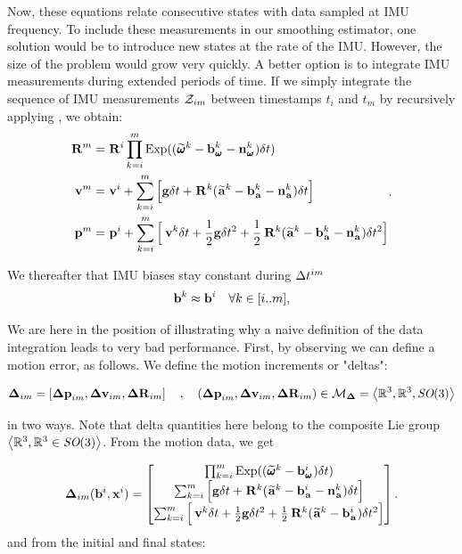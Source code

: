 Now, these equations relate consecutive states with data sampled at IMU frequency. To include these measurements in our smoothing estimator,
one solution would be to introduce new states at the rate of the IMU. However, the size of the problem would grow very quickly. A better option
is to integrate IMU measurements during extended periods of time. If we simply integrate the sequence of IMU measurements $\mathcal{Z}_{im}$ between timestamps 
$t_i$ and $t_m$ by recursively applying , we obtain:
%
\begin{equation}
    \begin{split}
    \prescript{}{}{{\bf R}}_{}^{m}  &= \prescript{}{}{{\bf R}}_{}^{i} \prod_{k=i}^{m} \operatorname*{Exp}((\prescript{}{}{\widetilde{\pmb{\omega}}}_{}^k - {\bf b}_{\prescript{}{}{\pmb{\omega}}_{}}^k - {\bf n}_{\prescript{}{}{\pmb{\omega}}_{}}^k)\delta t) \\
    \prescript{}{}{{\bf v}}_{}^{m}  &= \prescript{}{}{{\bf v}}_{}^{i} + \sum_{k=i}^{m} \Big[{\bf g} \delta t + \prescript{}{}{{\bf R}}_{}^{k}(\prescript{}{}{\widetilde{{\bf a}}}_{}^k - {\bf b}_{\prescript{}{}{{\bf a}}_{}}^k - {\bf n}_{\prescript{}{}{{\bf a}}_{}}^k)\delta t \Big]  \\
    \prescript{}{}{{\bf p}}_{}^{m} &= \prescript{}{}{{\bf p}}_{}^{i} + \sum_{k=i}^{m} \Big[\prescript{}{}{{\bf v}}_{}^{k}\delta t + \frac{1}{2}{\bf g} \delta t^2 
    + \frac{1}{2}\prescript{}{}{{\bf R}}_{}^{k}(\prescript{}{}{\widetilde{{\bf a}}}_{}^k - {\bf b}_{\prescript{}{}{{\bf a}}_{}}^k - {\bf n}_{\prescript{}{}{{\bf a}}_{}}^k)\delta t^2 \Big]
    \end{split}.
    \label{eq:IMUIntij}
\end{equation}

We thereafter that IMU biases stay constant during $\Delta t^{im}$
\begin{equation*}
    {\bf b}^k \approx {\bf b}^i  ~~~ \forall k \in [i..m],
\end{equation*}

We are here in the position of illustrating why a naive definition of the data integration leads to very bad performance. 
First, by observing  we can define a motion error, as follows. We define the motion increments or "deltas":

\begin{equation}
    {\bm \Delta}_{im} = \left[{\bm \Delta {\bf p}}_{im}, {\bm \Delta {\bf v}}_{im}, {\bm \Delta {\bf R}}_{im} \right] \quad , \quad ({\bm \Delta {\bf p}}_{im},{\bm \Delta {\bf v}}_{im},{\bm \Delta {\bf R}}_{im}) \in \mathcal{M}_{{\bm \Delta}}=\left< \mathbb{R}^3,\mathbb{R}^3, \textit{SO}(3) \right>
    \label{eq:delta_imu_def}
\end{equation}

in two ways. Note that delta quantities here belong to the composite Lie group $\left< \mathbb{R}^3,\mathbb{R}^3\in \textit{SO}(3) \right>$. From the motion data, we get

\begin{align}
    {\bm \Delta}_{im}({\bf b}^i, {\bf x}^i) = 
    \begin{bmatrix}
    \prod_{k=i}^{m} \operatorname*{Exp}((\prescript{}{}{\widetilde{\pmb{\omega}}}_{}^k - {\bf b}_{\prescript{}{}{\pmb{\omega}}_{}}^i)\delta t)  \\
    \sum_{k=i}^{m} \Big[{\bf g} \delta t + \prescript{}{}{{\bf R}}_{}^{k}(\prescript{}{}{\widetilde{{\bf a}}}_{}^k - {\bf b}_{\prescript{}{}{{\bf a}}_{}}^i - {\bf n}_{\prescript{}{}{{\bf a}}_{}}^k)\delta t \Big]  \\
    \sum_{k=i}^{m} \Big[\prescript{}{}{{\bf v}}_{}^{k}\delta t + \frac{1}{2}{\bf g} \delta t^2 
    + \frac{1}{2}\prescript{}{}{{\bf R}}_{}^{k}(\prescript{}{}{\widetilde{{\bf a}}}_{}^k - {\bf b}_{\prescript{}{}{{\bf a}}_{}}^i)\delta t^2 \Big]
    \end{bmatrix}.
    \label{eq:imu_delta_naive}
\end{align}
%
and from the initial and final states:

